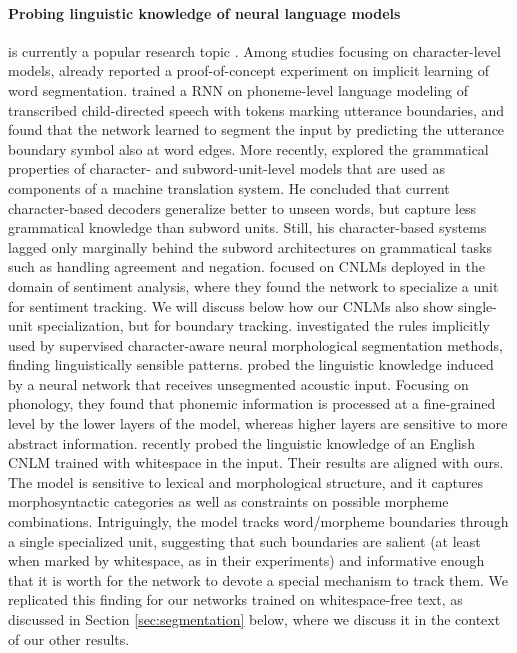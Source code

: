 \paragraph{Probing linguistic knowledge of neural language models} is
currently a popular research topic
\cite{Li:etal:2016,Linzen:etal:2016,Shi:etal:2016,Adi:etal:2017,Belinkov:etal:2017,Kadar:etal:2017,Hupkes:etal:2017,Conneau:etal:2018,Ettinger:etal:2018,Linzen:etal:2018}. Among
studies focusing on character-level models, already
 reported a proof-of-concept experiment on
implicit learning of word
segmentation.  trained a RNN on
phoneme-level language modeling of transcribed child-directed speech
with tokens marking utterance boundaries, and found that the network
learned to segment the input by predicting the utterance boundary
symbol also at word edges. More recently, 
explored the grammatical properties of character- and
subword-unit-level models that are used as components of a machine
translation system. He concluded that current character-based decoders
generalize better to unseen words, but capture less grammatical
knowledge than subword units. Still, his character-based systems
lagged only marginally behind the subword architectures on grammatical
tasks such as handling agreement and
negation.  focused on CNLMs
deployed in the domain of sentiment analysis, where they found the
network to specialize a unit for sentiment tracking. We will discuss
below how our CNLMs also show single-unit specialization, but for boundary
tracking.  investigated the rules implicitly
used by supervised character-aware neural morphological segmentation
methods, finding linguistically sensible
patterns.  probed the linguistic knowledge
induced by a neural network that receives unsegmented acoustic
input. Focusing on phonology, they found that phonemic information is
processed at a fine-grained level by the lower layers of the model,
whereas higher layers are sensitive to more abstract
information. %
 recently probed the linguistic
knowledge of an English CNLM trained with whitespace in the
input. Their results are aligned with ours. The model is sensitive to
lexical and morphological structure, and it captures morphosyntactic
categories as well as constraints on possible morpheme
combinations. Intriguingly, the model tracks word/morpheme boundaries
through a single specialized unit, suggesting that such boundaries are
salient (at least when marked by whitespace, as in their experiments)
and informative enough that it is worth for the network to devote a
special mechanism to track them. We replicated this finding for our
networks trained on whitespace-free text, as discussed in Section
\ref{sec:segmentation} below, where we discuss it in the context of our
other results.

